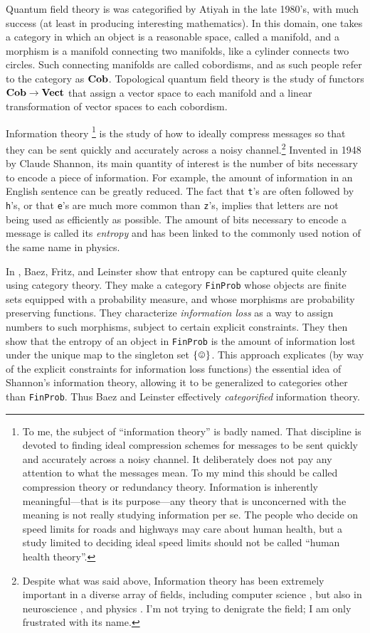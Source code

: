 Quantum field theory is was categorified by Atiyah \cite{Ati} in the late 1980's, with much success (at least in producing interesting mathematics). In this domain, one takes a category in which an object is a reasonable space, called a manifold, and a morphism is a manifold connecting two manifolds, like a cylinder connects two circles. Such connecting manifolds are called cobordisms, and as such people refer to the category as ${\bf Cob}$. Topological quantum field theory is the study of functors ${\bf Cob}\rightarrow{\bf Vect}$ that assign a vector space to each manifold and a linear transformation of vector spaces to each cobordism. 

Information theory 
\footnote{To me, the subject of “information theory” is badly named. That discipline is devoted to finding ideal compression schemes for messages to be sent quickly and accurately across a noisy channel. It deliberately does not pay any attention to what the messages mean. To my mind this should be called compression theory or redundancy theory. Information is inherently meaningful—that is its purpose—any theory that is unconcerned with the meaning is not really studying information per se. The people who decide on speed limits for roads and highways may care about human health, but a study limited to deciding ideal speed limits should not be called “human health theory”.} 
is the study of how to ideally compress messages so that they can be sent quickly and accurately across a noisy channel.\footnote{Despite what was said above, Information theory has been extremely important in a diverse array of fields, including computer science \cite{MacK}, but also in neuroscience \cite{Bar}, \cite{Lin} and physics \cite{Eve}. I'm not trying to denigrate the field; I am only frustrated with its name.} Invented in 1948 by Claude Shannon, its main quantity of interest is the number of bits necessary to encode a piece of information. For example, the amount of information in an English sentence can be greatly reduced. The fact that {\tt t}'s are often followed by {\tt h}'s, or that {\tt e}'s are much more common than {\tt z}'s, implies that letters are not being used as efficiently as possible. The amount of bits necessary to encode a message is called its {\em entropy} and has been linked to the commonly used notion of the same name in physics. 

In \cite{BFL}, Baez, Fritz, and Leinster show that entropy can be captured quite cleanly using category theory. They make a category {\tt FinProb} whose objects are finite sets equipped with a probability measure, and whose morphisms are probability preserving functions. They characterize {\em information loss} as a way to assign numbers to such morphisms, subject to certain explicit constraints. They then show that the entropy of an object in {\tt FinProb} is the amount of information lost under the unique map to the singleton set $\singleton$. This approach explicates (by way of the explicit constraints for information loss functions) the essential idea of Shannon's information theory, allowing it to be generalized to categories other than {\tt FinProb}. Thus Baez and Leinster effectively {\em categorified} information theory.

